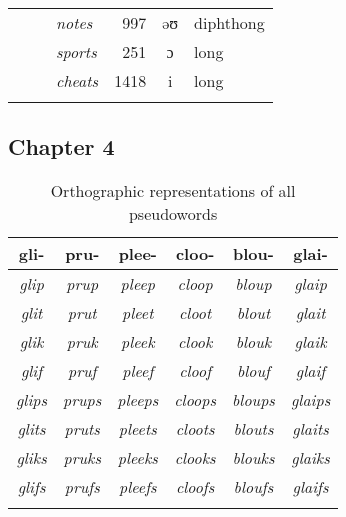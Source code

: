 \begin{table}[H]
\begin{tabular}{lllrcl}
                                                                & ~                                                    & \textit{notes}    & 997       & əʊ     & diphthong          \\
                                                                & ~                                                    & \textit{sports}  & 251       & ɔ     & long          \\
                                                                & ~                                                    & \textit{cheats}    & 1418      & i     & long          \\
\lspbottomrule
\end{tabular}
\end{table}


\subsection{Chapter 4}

\begin{table}[H]\fontsize{10}{11}
\caption{Orthographic representations of all pseudowords}
\label{tab:4.1}
\centering
\begin{tabular}{cccccc} 
\lsptoprule
gli-           & pru-           & plee-           & cloo-           & blou-           & glai-            \\ 
\midrule
\textit{glip}  & \textit{prup}  & \textit{pleep}  & \textit{cloop}  & \textit{bloup}  & \textit{glaip}   \\
\textit{glit}  & \textit{prut}  & \textit{pleet}  & \textit{cloot}  & \textit{blout}  & \textit{glait}   \\
\textit{glik}  & \textit{pruk}  & \textit{pleek}  & \textit{clook}  & \textit{blouk}  & \textit{glaik}   \\
\textit{glif}  & \textit{pruf}  & \textit{pleef}  & \textit{cloof}  & \textit{blouf}  & \textit{glaif}   \\ 
\midrule
\textit{glips} & \textit{prups} & \textit{pleeps} & \textit{cloops} & \textit{bloups} & \textit{glaips}  \\
\textit{glits} & \textit{pruts} & \textit{pleets} & \textit{cloots} & \textit{blouts} & \textit{glaits}  \\
\textit{gliks} & \textit{pruks} & \textit{pleeks} & \textit{clooks} & \textit{blouks} & \textit{glaiks}  \\
\textit{glifs} & \textit{prufs} & \textit{pleefs} & \textit{cloofs} & \textit{bloufs} & \textit{glaifs}  \\
\lspbottomrule
\end{tabular}
\end{table}





